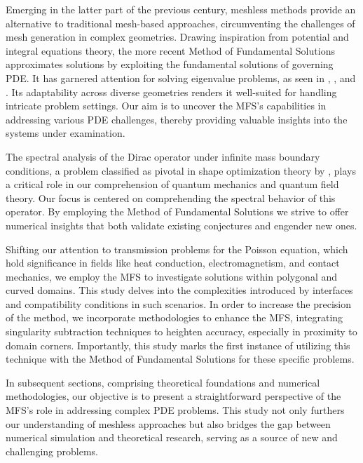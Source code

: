 Emerging in the latter part of the previous century, meshless methods provide an alternative to traditional mesh-based approaches, circumventing the challenges of mesh generation in complex geometries. Drawing inspiration from potential and integral equations theory, the more recent Method of Fundamental Solutions approximates solutions by exploiting the fundamental solutions of governing \ac{PDE}. It has garnered attention for solving eigenvalue problems, as seen in \cite{alves2013method}, \cite{reutskiy2006method}, and \cite{antunes2011inverse}. Its adaptability across diverse geometries renders it well-suited for handling intricate problem settings. Our aim is to uncover the \ac{MFS}'s capabilities in addressing various \ac{PDE} challenges, thereby providing valuable insights into the systems under examination.

The spectral analysis of the Dirac operator under infinite mass boundary conditions, a problem classified as pivotal in shape optimization theory by \cite{krejcirik_larson_lotoreichik_2019}, plays a critical role in our comprehension of quantum mechanics and quantum field theory. Our focus is centered on comprehending the spectral behavior of this operator. By employing the Method of Fundamental Solutions we strive to offer numerical insights that both validate existing conjectures and engender new ones.

Shifting our attention to transmission problems for the Poisson equation, which hold significance in fields like heat conduction, electromagnetism, and contact mechanics, we employ the \ac{MFS} to investigate solutions within polygonal and curved domains. This study delves into the complexities introduced by interfaces and compatibility conditions in such scenarios. In order to increase the precision of the method, we incorporate methodologies to enhance the \ac{MFS}, integrating singularity subtraction techniques to heighten accuracy, especially in proximity to domain corners. Importantly, this study marks the first instance of utilizing this technique with the Method of Fundamental Solutions for these specific problems.

In subsequent sections, comprising theoretical foundations and numerical methodologies, our objective is to present a straightforward perspective of the \ac{MFS}'s role in addressing complex \ac{PDE} problems. This study not only furthers our understanding of meshless approaches but also bridges the gap between numerical simulation and theoretical research, serving as a source of new and challenging problems.



